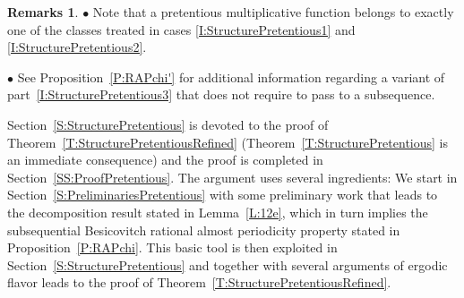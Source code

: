 \documentclass[11pt]{amsart}
\newtheorem{corollary}[lemma]{Corollary}
\theoremstyle{definition}
\newtheorem*{remarks}{Remarks}
\newcommand{\N}{{\mathbb N}}
\newcommand{\U}{{\mathbb U}}
\begin{document}
 	\begin{remarks}
 		$\bullet$ Note that a pretentious multiplicative function belongs to exactly one of the classes treated in cases \eqref{I:StructurePretentious1} and \eqref{I:StructurePretentious2}.
 		
 		
 	$\bullet$ See  Proposition~\ref{P:RAPchi'} for additional information  regarding  a variant of part~\eqref{I:StructurePretentious3} that does not require to pass to a subsequence.
 	\end{remarks}
 	Section~\ref{S:StructurePretentious} is devoted to the proof of Theorem~\ref{T:StructurePretentiousRefined} (Theorem~\ref{T:StructurePretentious} is an immediate  consequence) and  the proof  is completed in Section~\ref{SS:ProofPretentious}. The argument uses several ingredients: We start in   Section~\ref{S:PreliminariesPretentious}  with some preliminary work that leads to  the decomposition result stated in Lemma~\ref{L:12e}, which in turn  implies the subsequential Besicovitch rational almost periodicity property stated in Proposition~\ref{P:RAPchi}. This basic tool is then exploited in Section~\ref{S:StructurePretentious} and together with several arguments of ergodic flavor leads to the proof of Theorem~\ref{T:StructurePretentiousRefined}.
 	


	
	
\end{document}
